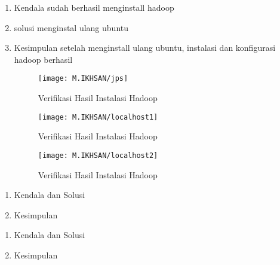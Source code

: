 
\begin{enumerate}
\item Kendala
\newline 
sudah berhasil menginstall hadoop

\item solusi
\newline
menginstal ulang ubuntu

\item Kesimpulan
\newline
setelah menginstall ulang ubuntu, instalasi dan konfigurasi hadoop berhasil

\begin{figure}[!ht]
\texttt{[image: M.IKHSAN/jps]}
\caption{Verifikasi Hasil Instalasi Hadoop}
\label{gam:Java-version(M.IKHSAN)}
\end{figure} 

\begin{figure}[!ht]
\texttt{[image: M.IKHSAN/localhost1]}
\caption{Verifikasi Hasil Instalasi Hadoop}
\label{gam:Java-version(M.IKHSAN)}
\end{figure} 

\begin{figure}[!ht]
\texttt{[image: M.IKHSAN/localhost2]}
\caption{Verifikasi Hasil Instalasi Hadoop}
\label{gam:Hadoop-version(M.IKHSAN)}
\end{figure}

\end{enumerate}


\begin{enumerate}
\item Kendala dan Solusi

\item Kesimpulan

\end{enumerate}

\begin{enumerate}
\item Kendala dan Solusi

\item Kesimpulan

\end{enumerate}


